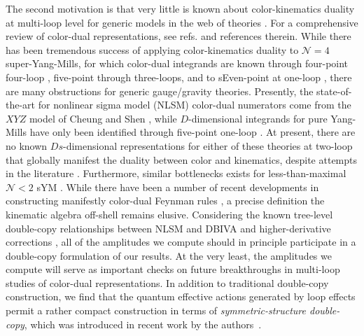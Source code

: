 \documentclass[12pt,letter]{article}
\begin{document}
The second motivation is that very little is known about color-kinematics duality at multi-loop level for generic models in the web of theories \cite{BCJreview}. For a comprehensive review of color-dual representations, see refs. \cite{BCJreview, Bern:2022wqg, Adamo:2022dcm} and references therein. While there has been tremendous success of applying color-kinematics duality to $\mathcal{N}=4$ super-Yang-Mills, for which color-dual integrands are known through four-point four-loop \cite{Bern:2012uf, Neq44np, GravityFour}, five-point through three-loops, and to sEven-point at one-loop \cite{Bjerrum-Bohr:2013iza,Edison:2020uzf,Edison:2022jln}, there are many obstructions for generic gauge/gravity theories. Presently, the state-of-the-art for nonlinear sigma model (NLSM) color-dual numerators come from the $XY\!Z$ model of Cheung and Shen \cite{Cheung2016prv}, while $D$-dimensional integrands for pure Yang-Mills have only been identified through five-point one-loop \cite{He:2017spx}. At present, there are no known $Ds$-dimensional representations for either of these theories at two-loop that globally manifest the duality between color and kinematics, despite attempts in the literature \cite{OneTwoLoopPureYMBCJ, Mogull:2015adi, Bern:2015ooa, Geyer:2019hnn}. Furthermore, similar bottlenecks exists for less-than-maximal $\mathcal{N}<2$ sYM \cite{Johansson:2017bfl}. While there have been a number of recent developments in constructing manifestly color-dual Feynman rules \cite{Chen:2019ywi,Chen:2021chy,Brandhuber:2021bsf,Cheung:2021zvb,Ben-Shahar:2021zww,Cheung:2022mix, Ben-Shahar:2022ixa}, a precise definition the kinematic algebra off-shell remains elusive. Considering the known tree-level double-copy relationships between NLSM and DBIVA and higher-derivative corrections \cite{Cachazo:2014xea,Carrasco:2016ldy}, all of the amplitudes we compute should in principle participate in a double-copy formulation of our results. At the very least, the amplitudes we compute will serve as important checks on future breakthroughs in multi-loop studies of color-dual representations. In addition to traditional double-copy construction, we find that the quantum effective actions generated by loop effects permit a rather compact construction in terms of \textit{symmetric-structure double-copy}, which was introduced in recent work by the authors~\cite{Carrasco:2022jxn}. 
\end{document}
